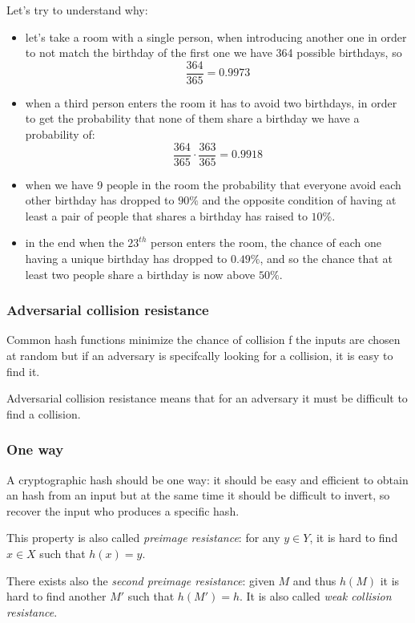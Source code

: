 Let's try to understand why:
\begin{itemize}
    \item let's take a room with a single person, when introducing another one in order to not match the birthday of the first one we have 364 possible birthdays, so 
$$
    \frac{364}{365} = 0.9973
$$
    \item when a third person enters the room it has to avoid two birthdays, in order to get the probability that none of them share a birthday we have a probability of:
$$
    \frac{364}{365} \cdot \frac{363}{365} = 0.9918
$$
    \item when we have 9 people in the room the probability that everyone avoid each other birthday has dropped to $90\%$ and the opposite condition of having at least a pair of people that shares a birthday has raised to $10\%$.

    \item in the end when the $23^{th}$ person enters the room, the chance of each one having a unique birthday has dropped to $0.49\%$, and so the chance that at least two people share a birthday is now above $50\%$.
\end{itemize}

\subsubsection{Adversarial collision resistance}
Common hash functions minimize the chance of collision f the inputs are chosen at random but if an adversary is specifcally looking for a collision, it is easy to find it.

Adversarial collision resistance means that for an adversary it must be difficult to find a collision.

\subsubsection{One way}
A cryptographic hash should be one way: it should be easy and efficient to obtain an hash from an input but at the same time it should be difficult to invert, so recover the input who produces a specific hash.

This property is also called \emph{preimage resistance}: for any $y \in Y$, it is hard to find $x \in X$ such that $h(x) = y$. 

There exists also the \emph{second preimage resistance}: given $M$ and thus $h(M)$ it is hard to find another $M'$ such that $h(M') = h$.
It is also called \emph{weak collision resistance}. 

